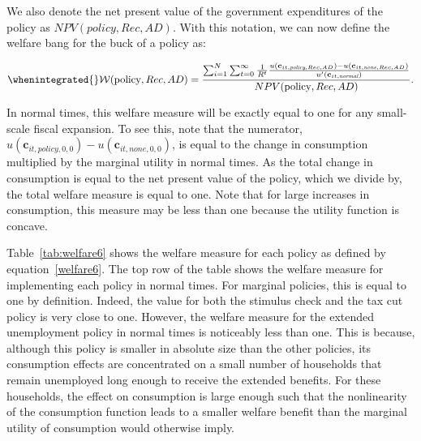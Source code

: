 \documentclass[\latexroot/\projectname]{subfiles}
\begin{document}
We also denote the net present value of the government expenditures of the policy as $NPV(\textit{policy},Rec,AD)$.
With this notation, we can now define the welfare bang for the buck of a policy as:

\begin{equation}
  \begin{gathered}
    \begin{aligned}
      \whenintegrated{\label{welfare6}}
      \mathcal{W}(\text{policy},Rec,AD) =\frac{\sum_{i=1}^{N} \sum_{t=0}^{\infty} \frac{1}{R^t} \frac{u(\mathbf{c}_{it,\textit{policy},Rec,AD}) - u(\mathbf{c}_{it,\textit{none},Rec,AD})}{ u'(\mathbf{c}_{it,\textit{normal}})}}{NPV(\text{policy},Rec,AD)}.
    \end{aligned}
  \end{gathered}
\end{equation}

In normal times, this welfare measure will be exactly equal to one for any small-scale fiscal expansion.
To see this, note that the numerator,  $u(\mathbf{c}_{it,\textit{policy},0,0}) - u(\mathbf{c}_{it,\textit{none},0,0})$, is equal to the change in consumption multiplied by the marginal utility in normal times.
As the total change in consumption is equal to the net present value of the policy, which we divide by, the total welfare measure is equal to one.
Note that for large increases in consumption, this measure may be less than one because the utility function is concave.



Table~\ref{tab:welfare6} shows the welfare measure for each policy as defined by equation~\eqref{welfare6}.
The top row of the table shows the welfare measure for implementing each policy in normal times.
For marginal policies, this is equal to one by definition.
Indeed, the value for both the stimulus check and the tax cut policy is very close to one.
However, the welfare measure for the extended unemployment policy in normal times is noticeably less than one.
This is because, although this policy is smaller in absolute size than the other policies, its consumption effects are concentrated on a small number of households that remain unemployed long enough to receive the extended benefits.
For these households, the effect on consumption is large enough such that the nonlinearity of the consumption function leads to a smaller welfare benefit than the marginal utility of consumption would otherwise imply.
\end{document}

